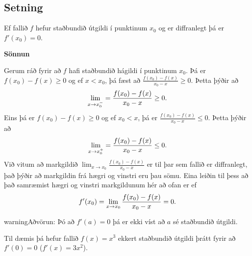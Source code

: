\documentclass[b5paper,10pt,icelandic]{sphinxmanual}
\begin{document}
\subsection{Setning}
\label{kafli03:id11}\label{kafli03:setning-3-5-2}
Ef fallið \(f\) hefur staðbundið útgildi í punktinum \(x_0\) og
er diffranlegt þá er \(f'(x_0)=0\).

\begin{DUlineblock}{0em}
\item[] 
\end{DUlineblock}

\textbf{Sönnun}

Gerum ráð fyrir að \(f\) hafi staðbundið hágildi í punktinum \(x_0\).
Þá er \(f(x_0)-f(x)\geq 0\) og ef \(x<x_0\),
þá fæst að  \(\frac{f(x_0)-f(x)}{x_0-x}\geq 0\). Þetta þýðir að
\begin{gather}
\begin{split}\lim_{x \to x_0^-} = \frac{f(x_0) - f(x)}{x_0-x} \geq 0.
    \label{vinstri}\end{split}\notag
\end{gather}
Eins þá er \(f(x_0)-f(x)\geq 0\) og ef \(x_0<x\),
þá er \(\frac{f(x_0)-f(x)}{x_0-x} \leq 0\).
Þetta þýðir að
\begin{gather}
\begin{split}\lim_{x \to x_0^+} = \frac{f(x_0) - f(x)}{x_0-x} \leq 0.
    \label{haegri}\end{split}\notag
\end{gather}
Við vitum að markgildið
\(\lim_{x\to x_0} \frac{f(x_0)-f(x)}{x_0-x}\) er til þar sem fallið
er diffranlegt, það þýðir að markgildin frá hægri og vinstri eru þau
sömu. Eina leiðin til þess að það samræmist hægri og vinstri markgildunum
hér að ofan er ef
\begin{gather}
\begin{split}f'(x_0) = \lim_{x\to x_0} \frac{f(x_0)-f(x)}{x_0-x} = 0.\end{split}\notag
\end{gather}
\begin{DUlineblock}{0em}
\item[] 
\item[] 
\end{DUlineblock}

\begin{notice}{warning}{Aðvörun:}
Þó að \(f'(a)=0\) þá er ekki víst að \(a\) sé staðbundið útgildi.

Til dæmis þá hefur fallið \(f(x) = x^3\) ekkert staðbundið útgildi
þrátt fyrir að \(f'(0) = 0\) (\(f'(x) = 3x^2\)).
\end{notice}
\end{document}
